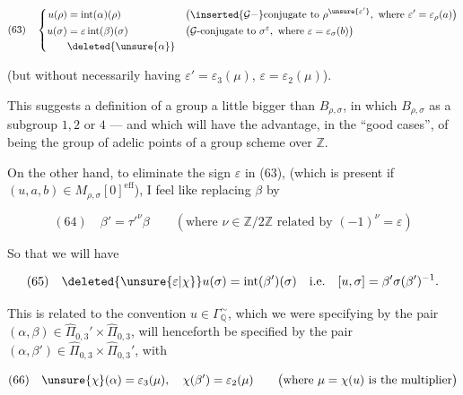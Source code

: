
\[
(63)\quad
\left\{\begin{aligned}
u(\rho)&=\operatorname{int}(\alpha)(\rho)
&&\bigl(\inserted{\mathcal G-}\text{conjugate to }\rho^{\unsure{\varepsilon'}},
\text{ where }\varepsilon'=\varepsilon_\rho(a)\bigr)\\
u(\sigma)&=\varepsilon\operatorname{int}(\beta)(\sigma)
&&\bigl(\mathcal G\text{-conjugate to }\sigma^\varepsilon,
\text{ where }\varepsilon=\varepsilon_\sigma(b)\bigr)\\
&\deleted{\unsure{\alpha}}
\end{aligned}\right.
\]

(but without necessarily having
$\varepsilon'=\varepsilon_3(\mu)$, $\varepsilon=\varepsilon_2(\mu)$).

This suggests a definition of a group a little bigger than $B_{\rho,\sigma}$,
in which $B_{\rho,\sigma}$  
as a  subgroup 
$1,2$ or $4$ --- and which will have the advantage, in the ``good cases'', of being the group
of adelic points of a  group scheme over $\mathbb Z$.

On the other hand, to  eliminate the sign
$\varepsilon$ in (63), (which is present  if
$(u,a,b)\in M_{\rho,\sigma}[0]^{\mathrm{eff}}$), I feel like replacing $\beta$ by


\[
(64)\quad \beta'=\tau'^{\nu}\beta
\qquad\left(\text{where }\nu\in\mathbb Z/2\mathbb Z\text{ related by }
(-1)^\nu=\varepsilon\right)
\]

So that we will have

\[
(65)\quad \deleted{\unsure{\varepsilon|\chi}}u(\sigma)=\operatorname{int}(\beta')(\sigma)
\quad\text{i.e.}\quad [u,\sigma]=\beta'\sigma(\beta')^{-1}.
\]

This is related to the convention 
$u\in\Gamma_{\mathbb Q}^{\sim}$, which we were specifying by the pair
$(\alpha,\beta)\in\widehat{\Pi}_{0,3}'\times\widehat{\Pi}_{0,3}$,
will henceforth be specified by the pair
$(\alpha,\beta')\in\widehat{\Pi}_{0,3}\times\widehat{\Pi}_{0,3}'$, with

\[
(66)\quad\unsure{\chi}(\alpha)=\varepsilon_3(\mu),
\quad\chi(\beta')=\varepsilon_2(\mu)
\qquad\bigl(\text{where }\mu=\chi(u)\text{ is the multiplier}\bigr)
\]


